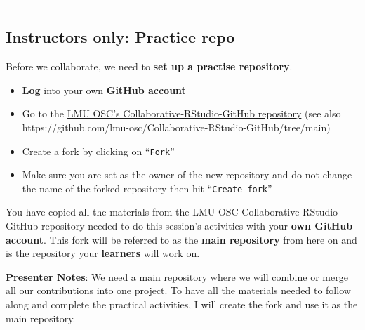 \documentclass[
  letterpaper,
  DIV=11,
  numbers=noendperiod]{scrartcl}
\providecommand{\tightlist}{%
  \setlength{\itemsep}{0pt}\setlength{\parskip}{0pt}}
\begin{document}
\begin{center}\rule{0.5\linewidth}{0.5pt}\end{center}

\subsection{Instructors only: Practice
repo}\label{instructors-only-practice-repo}

Before we collaborate, we need to \textbf{set up a practise repository}.

\begin{itemize}
\tightlist
\item
  \textbf{Log} into your own \textbf{GitHub account}
\item
  Go to the
  \href{https://github.com/lmu-osc/Collaborative-RStudio-GitHub/tree/main}{LMU
  OSC's Collaborative-RStudio-GitHub repository} (see also
  https://github.com/lmu-osc/Collaborative-RStudio-GitHub/tree/main)
\item
  Create a fork by clicking on ``\texttt{Fork}''
\item
  Make sure you are set as the owner of the new repository and do not
  change the name of the forked repository then hit
  ``\texttt{Create\ fork}''
\end{itemize}

\begin{tcolorbox}[enhanced jigsaw, colbacktitle=quarto-callout-important-color!10!white, opacityback=0, leftrule=.75mm, colback=white, opacitybacktitle=0.6, colframe=quarto-callout-important-color-frame, title=\textcolor{quarto-callout-important-color}{\faExclamation}\hspace{0.5em}{Now you have your practice repository!}, left=2mm, titlerule=0mm, toptitle=1mm, breakable, bottomtitle=1mm, arc=.35mm, rightrule=.15mm, bottomrule=.15mm, toprule=.15mm, coltitle=black]

You have copied all the materials from the LMU OSC
Collaborative-RStudio-GitHub repository needed to do this session's
activities with your \textbf{own GitHub account}. This fork will be
referred to as the \textbf{main repository} from here on and is the
repository your \textbf{learners} will work on.

\end{tcolorbox}

\textbf{Presenter Notes}: We need a main repository where we will
combine or merge all our contributions into one project. To have all the
materials needed to follow along and complete the practical activities,
I will create the fork and use it as the main repository.
\end{document}
